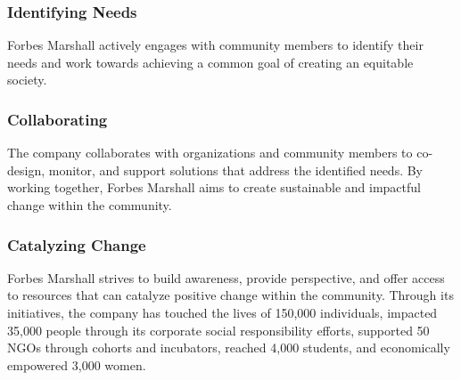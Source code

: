 \subsubsection{Identifying Needs}
Forbes Marshall actively engages with community members to identify their needs and work towards achieving a common goal of creating an equitable society.

\subsubsection{Collaborating}
The company collaborates with organizations and community members to co-design, monitor, and support solutions that address the identified needs. By working together, Forbes Marshall aims to create sustainable and impactful change within the community.

\subsubsection{Catalyzing Change}
Forbes Marshall strives to build awareness, provide perspective, and offer access to resources that can catalyze positive change within the community. Through its initiatives, the company has touched the lives of 150,000 individuals, impacted 35,000 people through its corporate social responsibility efforts, supported 50 NGOs through cohorts and incubators, reached 4,000 students, and economically empowered 3,000 women.

